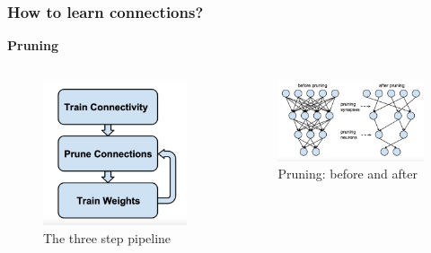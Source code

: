 \documentclass{beamer}
\begin{document}
  \begin{frame}
    \frametitle{How to learn connections?}
    \textbf{Pruning}\\
    \begin{columns}
        \begin{figure}
            \centering
            \includegraphics[width=\textwidth]{images/pruning_pipeline.png}
            \caption{The three step pipeline}
        \end{figure}
        \begin{figure}
            \centering
            \includegraphics[width=\textwidth]{images/pruning_before_and_after.png}
            \caption{Pruning: before and after}
        \end{figure}
    \end{columns}
  \end{frame}
  
\end{document}
